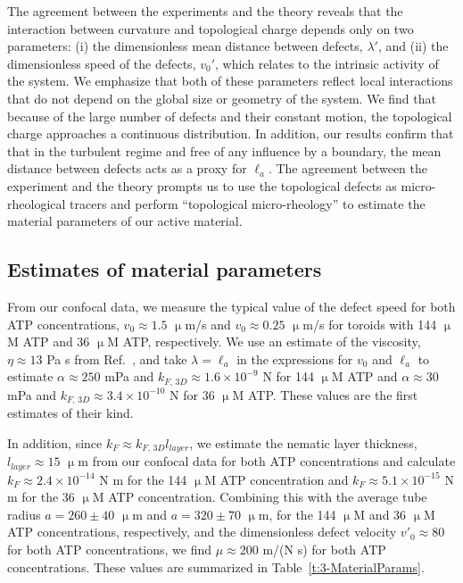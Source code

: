 The agreement between the experiments and the theory reveals that the interaction between curvature and topological charge depends only on two parameters: (i) the dimensionless mean distance between defects, $\lambda'$, and (ii) the dimensionless speed of the defects, $v_0'$, which relates to the intrinsic activity of the system.
We emphasize that both of these parameters reflect local interactions that do not depend on the global size or geometry of the system.
We find that because of the large number of defects and their constant motion, the topological charge approaches a continuous distribution.
In addition, our results confirm that that in the turbulent regime and free of any influence by a boundary, the mean distance between defects acts as a
proxy for $\ell_a$.
The agreement between the experiment and the theory prompts us to use the topological defects as micro-rheological tracers and perform “topological micro-rheology” to estimate the material parameters of our active material.


\subsection{Estimates of material parameters}
From our confocal data, we measure the typical value of the defect speed for both ATP concentrations, $v_0 \approx 1.5$ $\upmu$m/s and $v_0 \approx 0.25$ $\upmu$m/s for toroids with 144 $\upmu$M ATP and 36 $\upmu$M ATP, respectively.
We use an estimate of the viscosity, $\eta \approx 13$ Pa s from Ref.~\cite{RN135}, and take $\lambda = \ell_a$ in the expressions for $v_0$ and $\ell_a$ to estimate $\alpha \approx  250$ mPa and $k_{F,\, 3D} \approx 1.6 \times 10^{-9}$ N for 144 $\upmu$M ATP and $\alpha \approx  30$ mPa and $k_{F,\, 3D} \approx 3.4 \times 10^{-10}$ N for 36 $\upmu$M ATP.
These values are the first estimates of their kind.

In addition, since $k_F \approx k_{F,\,3D}l_{layer}$, we estimate the nematic layer thickness, $l_{layer} \approx 15$ $\upmu$m from our confocal data for both ATP concentrations and calculate $k_F \approx 2.4 \times 10^{-14}$ N m for the 144 $\upmu$M ATP concentration and $k_F \approx 5.1 \times 10^{-15}$ N m for the 36 $\upmu$M ATP concentration.
Combining this with the average tube radius $a = 260 \pm 40$ $\upmu$m and $a = 320 \pm 70$ $\upmu$m, for the 144 $\upmu$M and 36 $\upmu$M ATP concentrations, respectively, and the dimensionless defect velocity $v'_0 \approx 80$ for both ATP concentrations, we find $\mu \approx 200$ m/(N s) for both ATP concentrations.
These values are summarized in Table~\ref{t:3-MaterialParams}.


